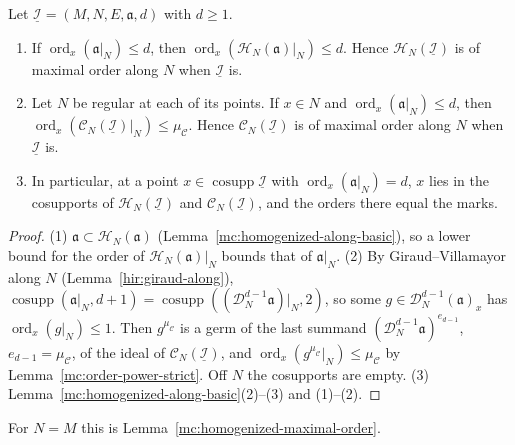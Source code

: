\begin{proposition}
\label{mc:homogenized-along-maximal-order}
\leanok
Let \(\underline{\mathcal I}=(M,N,E,\mathfrak a,d)\) with \(d\ge1\).
\begin{enumerate}
\item If \(\operatorname{ord}_x(\mathfrak a|_N)\le d\), then \(\operatorname{ord}_x(\mathcal H_N(\mathfrak a)|_N)\le d\). Hence \(\mathcal H_N(\underline{\mathcal I})\) is of maximal order along
\(N\) when \(\underline{\mathcal I}\) is.
\item Let \(N\) be regular at each of its points. If \(x\in N\) and \(\operatorname{ord}_x(\mathfrak a|_N)\le d\), then \(\operatorname{ord}_x(\mathcal C_N(\underline{\mathcal I})|_N)\le\mu_{\mathcal C}\).
Hence \(\mathcal C_N(\underline{\mathcal I})\) is of maximal order along \(N\) when \(\underline{\mathcal I}\) is.
\item In particular, at a point \(x\in\operatorname{cosupp}\underline{\mathcal I}\) with \(\operatorname{ord}_x(\mathfrak a|_N)=d\), \(x\) lies in the cosupports of \(\mathcal H_N(\underline{\mathcal I})\)
and \(\mathcal C_N(\underline{\mathcal I})\), and the orders there equal the marks.
\end{enumerate}
\end{proposition}
\begin{proof}
\leanok
(1) \(\mathfrak a\subset\mathcal H_N(\mathfrak a)\) (Lemma~\ref{mc:homogenized-along-basic}), so a lower bound for the order of \(\mathcal H_N(\mathfrak a)|_N\) bounds that of
\(\mathfrak a|_N\).
(2) By Giraud--Villamayor along \(N\) (Lemma~\ref{hir:giraud-along}), \(\operatorname{cosupp}(\mathfrak a|_N,d+1)=\operatorname{cosupp}((\mathcal D_N^{d-1}\mathfrak a)|_N,2)\), so
some \(g\in\mathcal D_N^{d-1}(\mathfrak a)_x\) has \(\operatorname{ord}_x(g|_N)\le1\). Then \(g^{\mu_{\mathcal C}}\) is a germ of the last summand
\((\mathcal D_N^{d-1}\mathfrak a)^{e_{d-1}}\), \(e_{d-1}=\mu_{\mathcal C}\), of the ideal of \(\mathcal C_N(\underline{\mathcal I})\), and
\(\operatorname{ord}_x(g^{\mu_{\mathcal C}}|_N)\le\mu_{\mathcal C}\) by Lemma~\ref{mc:order-power-strict}. Off \(N\) the cosupports are empty.
(3) Lemma~\ref{mc:homogenized-along-basic}(2)--(3) and (1)--(2).
\end{proof}
For \(N=M\) this is Lemma~\ref{mc:homogenized-maximal-order}.

